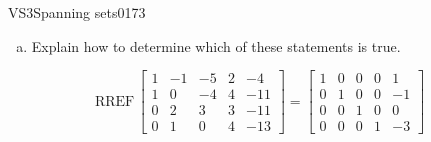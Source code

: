 \begin{exercise}{VS3}{Spanning sets}{0173}
\begin{exerciseStatement}
\begin{enumerate}[(a)]
\begin{itemize}
 The set of vectors \(\left\{ \left[\begin{array}{c}
1 \\
1 \\
0 \\
0
\end{array}\right] , \left[\begin{array}{c}
-1 \\
0 \\
2 \\
1
\end{array}\right] , \left[\begin{array}{c}
-5 \\
-4 \\
3 \\
0
\end{array}\right] , \left[\begin{array}{c}
2 \\
4 \\
3 \\
4
\end{array}\right] , \left[\begin{array}{c}
-4 \\
-11 \\
-11 \\
-13
\end{array}\right] \right\}\) does \textbf{not} span \(\mathbb R^4\). 

 
\end{itemize}

     
\item  

 Explain how to determine which of these statements is true. 

 
\end{enumerate}

     \end{exerciseStatement}
 \begin{exerciseAnswer} 

 \[
\mathrm{RREF}\, \left[\begin{array}{ccccc}
1 & -1 & -5 & 2 & -4 \\
1 & 0 & -4 & 4 & -11 \\
0 & 2 & 3 & 3 & -11 \\
0 & 1 & 0 & 4 & -13
\end{array}\right] = \left[\begin{array}{ccccc}
1 & 0 & 0 & 0 & 1 \\
0 & 1 & 0 & 0 & -1 \\
0 & 0 & 1 & 0 & 0 \\
0 & 0 & 0 & 1 & -3
\end{array}\right]
            \] 


\end{exerciseAnswer}
\end{exercise}
